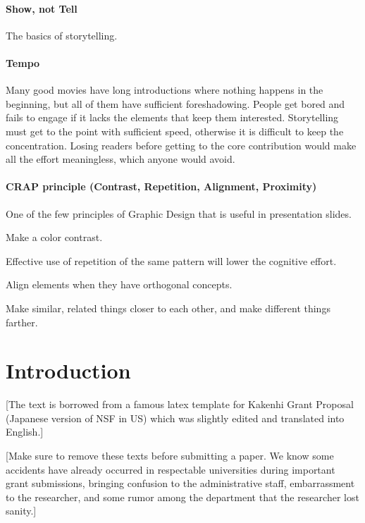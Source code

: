 \paragraph{Show, not Tell}

The basics of storytelling.

\paragraph{Tempo}

Many good movies have long introductions where nothing happens in the beginning, but all of them have sufficient foreshadowing.
People get bored and fails to engage if it lacks the elements that keep them interested.
Storytelling must get to the point with sufficient speed, otherwise it is difficult to keep the concentration.
Losing readers before getting to the core contribution would make all the effort meaningless, which anyone would avoid.

\paragraph{CRAP principle (Contrast, Repetition, Alignment, Proximity)}

One of the few principles of Graphic Design that is useful in presentation slides.

Make a color contrast.

Effective use of repetition of the same pattern
will lower the cognitive effort.

Align elements when they have orthogonal concepts.

Make similar, related things closer to each other,
and make different things farther.





\section{Introduction}

[The text is borrowed from a famous latex template for Kakenhi Grant
Proposal (Japanese version of NSF in US) which was slightly edited and translated into English.]

[Make sure to remove these texts before submitting a paper.
We know some accidents have already occurred in respectable universities during important grant submissions,
bringing confusion to the administrative staff, embarrassment to the researcher,
and some rumor among the department that the researcher lost sanity.]


